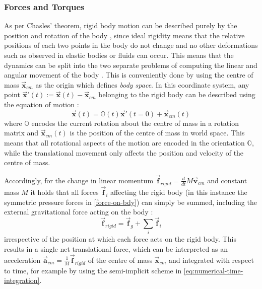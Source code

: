 \documentclass[oneside, a4paper]{book}
\newcommand\vek[1]{\vec{\bm{#1}}}
\begin{document}
    \subsubsection{Forces and Torques}
    As per Chasles' theorem, rigid body motion can be described purely by the position and rotation of the body \autocite{classical-mechanics}, since ideal rigidity means that the relative positions of each two points in the body do not change and no other deformations such as observed in elastic bodies or fluids can occur. This means that the dynamics can be split into the two separate problems of computing the linear and angular movement of the body \autocite{classical-mechanics}. This is conveniently done by using the centre of mass $\vek{x}_{cm}$ as the origin which defines \textit{body space}. In this coordinate system, any point $\vek{x}'(t) := \vek{x}(t) - \vek{x}_{cm} $ belonging to the rigid body can be described using the equation of motion \autocite{physically-based-rigids}:
    \begin{equation}\label{eq:rigid-body-equation-of-motion}
      \vek{x}(t) = \mathds{O}(t)\vek{x}'(t=0) + \vek{x}_{cm}(t)
    \end{equation}
    where $\mathds{O}$ encodes the current rotation about the centre of mass in a rotation matrix and $\vek{x}_{cm}(t)$ is the position of the centre of mass in world space. This means that all rotational aspects of the motion are encoded in the orientation $\mathds{O}$, while the translational movement only affects the position and velocity of the centre of mass. 
    
    Accordingly, for the change in linear momentum $\vek{f}_{rigid} = \frac{d}{dt} M\vek{v}_{cm}$ and constant mass $M$ it holds that all forces $\vek{f}_i$ affecting the rigid body (in this instance the symmetric pressure forces in \autoref{force-on-bdy}) can simply be summed, including the external gravitational force acting on the body \autocite{physically-based-rigids}:
    \begin{equation}\label{eq:f-rigid}
      \vek{f}_{rigid} = \vek{f}_g + \sum_i \vek{f}_i
    \end{equation}
    irrespective of the position at which each force acts on the rigid body. This results in a single net translational force, which can be interpreted as an acceleration $\vek{a}_{cm} = \frac{1}{M}\vek{f}_{rigid}$ of the centre of mass $\vek{x}_{cm}$ and integrated with respect to time, for example by using the semi-implicit scheme in \autoref{eq:numerical-time-integration}.
\end{document}
